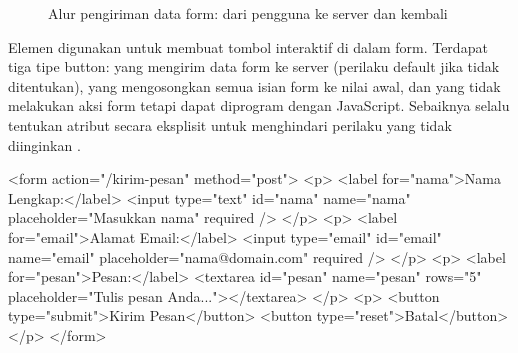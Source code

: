 \begin{figure}[htbp]
\centering
{}
\caption{Alur pengiriman data form: dari pengguna ke server dan kembali}
\end{figure}

Elemen  digunakan untuk membuat tombol interaktif di dalam form. Terdapat tiga tipe button:  yang mengirim data form ke server (perilaku default jika  tidak ditentukan),  yang mengosongkan semua isian form ke nilai awal, dan  yang tidak melakukan aksi form tetapi dapat diprogram dengan JavaScript. Sebaiknya selalu tentukan atribut  secara eksplisit untuk menghindari perilaku yang tidak diinginkan \cite{whatwgHtml}.

\begin{webcode}[language=HTML, caption={Form kontak lengkap dengan label dan button}]
<form action="/kirim-pesan" method="post">
  <p>
    <label for="nama">Nama Lengkap:</label>
    <input type="text" id="nama" name="nama"
           placeholder="Masukkan nama" required />
  </p>
  <p>
    <label for="email">Alamat Email:</label>
    <input type="email" id="email" name="email"
           placeholder="nama@domain.com" required />
  </p>
  <p>
    <label for="pesan">Pesan:</label>
    <textarea id="pesan" name="pesan" rows="5"
              placeholder="Tulis pesan Anda..."></textarea>
  </p>
  <p>
    <button type="submit">Kirim Pesan</button>
    <button type="reset">Batal</button>
  </p>
</form>
\end{webcode}

